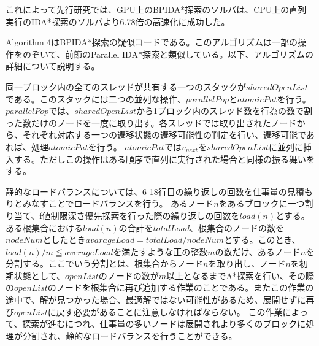 \documentclass[a4paper,11pt,oneside,openany]{jsbook}
\begin{document}
これによって先行研究\cite{HA17}では、GPU上のBPIDA*探索のソルバは、CPU上の直列実行のIDA*探索のソルバより6.78倍の高速化に成功した。

Algorithm 4はBPIDA*探索の疑似コードである。このアルゴリズムは一部の操作をのぞいて、前節のParallel IDA*探索と類似している。以下、アルゴリズムの詳細について説明する。

同一ブロック内の全てのスレッドが共有する一つのスタックが$sharedOpenList$である。このスタックには二つの並列な操作、$parallelPop$と$atomicPut$を行う。$parallelPop$では、$sharedOpenList$から1ブロック内のスレッド数を行為の数で割った数だけのノードを一度に取り出す。各スレッドでは取り出されたノードから、それぞれ対応する一つの遷移状態の遷移可能性の判定を行い、遷移可能であれば、処理$atomicPut$を行う。
$atomicPut$では$v_{next}$を$sharedOpenList$に並列に挿入する。ただしこの操作はある順序で直列に実行された場合と同様の振る舞いをする。

静的なロードバランスについては、6-18行目の繰り返しの回数を仕事量の見積もりとみなすことでロードバランスを行う。
あるノード$n$をあるブロックに一つ割り当て、f値制限深さ優先探索を行った際の繰り返しの回数を$load(n)$とする。ある根集合における$load(n)$の合計を$totalLoad$、根集合のノードの数を$nodeNum$としたとき$avarageLoad = totalLoad / nodeNum$とする。このとき、$load(n) / m \leqq averageLoad$を満たすような正の整数$m$の数だけ、あるノード$n$を分割する。ここでいう分割とは、根集合からノード$n$を取り出し、ノード$n$を初期状態として、$openList$のノードの数が$m$以上となるまでA*探索を行い、その際の$openList$のノードを根集合に再び追加する作業のことである。またこの作業の途中で、解が見つかった場合、最適解ではない可能性があるため、展開せずに再び$openList$に戻す必要があることに注意しなければならない。
この作業によって、探索が進むにつれ、仕事量の多いノードは展開されより多くのブロックに処理が分割され、静的なロードバランスを行うことができる。
\end{document}
